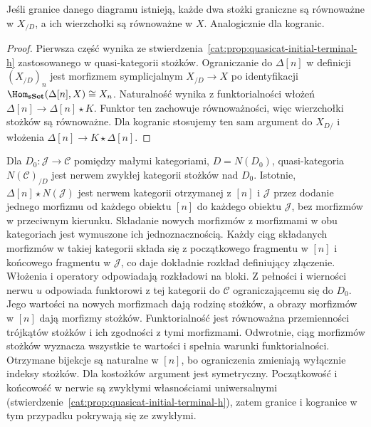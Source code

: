 \begin{stwierdzenie}\label{cat:prop:quasicat-limit-unique}
Jeśli granice danego diagramu istnieją, każde dwa stożki graniczne są równoważne w $X_{/D}$, a ich wierzchołki są równoważne w $X$. Analogicznie dla kogranic.
\end{stwierdzenie}
\begin{proof}
Pierwsza część wynika ze stwierdzenia~\ref{cat:prop:quasicat-initial-terminal-h} zastosowanego w quasi-kategorii stożków. Ograniczanie do $\Delta[n]$ w definicji $(X_{/D})_n$ jest morfizmem symplicjalnym $X_{/D}\to X$ po identyfikacji $\Hom_{\mathbf{sSet}}(\Delta[n],X)\cong X_n$. Naturalność wynika z funktorialności włożeń $\Delta[n]\to\Delta[n]\star K$. Funktor ten zachowuje równoważności, więc wierzchołki stożków są równoważne. Dla kogranic stosujemy ten sam argument do $X_{D/}$ i włożenia $\Delta[n]\to K\star\Delta[n]$.
\end{proof}

\begin{przyklad}\label{cat:ex:quasicat-ordinary-limits}
Dla $D_0:\mathcal J\to\mathcal C$ pomiędzy małymi kategoriami, $D=N(D_0)$, quasi-kategoria $N(\mathcal C)_{/D}$ jest nerwem zwykłej kategorii stożków nad $D_0$. Istotnie, $\Delta[n]\star N(\mathcal J)$ jest nerwem kategorii otrzymanej z $[n]$ i $\mathcal J$ przez dodanie jednego morfizmu od każdego obiektu $[n]$ do każdego obiektu $\mathcal J$, bez morfizmów w przeciwnym kierunku. Składanie nowych morfizmów z morfizmami w obu kategoriach jest wymuszone ich jednoznacznością. Każdy ciąg składanych morfizmów w takiej kategorii składa się z początkowego fragmentu w $[n]$ i końcowego fragmentu w $\mathcal J$, co daje dokładnie rozkład definiujący złączenie. Włożenia i operatory odpowiadają rozkładowi na bloki. Z pełności i wierności nerwu $u$ odpowiada funktorowi z tej kategorii do $\mathcal C$ ograniczającemu się do $D_0$. Jego wartości na nowych morfizmach dają rodzinę stożków, a obrazy morfizmów w $[n]$ dają morfizmy stożków. Funktorialność jest równoważna przemienności trójkątów stożków i ich zgodności z tymi morfizmami. Odwrotnie, ciąg morfizmów stożków wyznacza wszystkie te wartości i spełnia warunki funktorialności. Otrzymane bijekcje są naturalne w $[n]$, bo ograniczenia zmieniają wyłącznie indeksy stożków. Dla kostożków argument jest symetryczny. Początkowość i końcowość w nerwie są zwykłymi własnościami uniwersalnymi (stwierdzenie~\ref{cat:prop:quasicat-initial-terminal-h}), zatem granice i kogranice w tym przypadku pokrywają się ze zwykłymi.
\end{przyklad}

